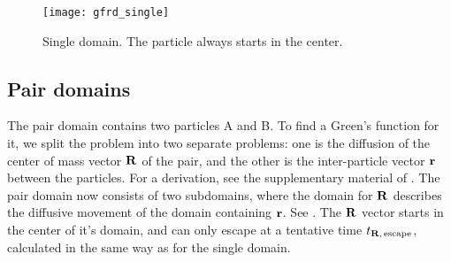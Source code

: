 \begin{figure}[ht]
\centering
\texttt{[image: gfrd\_single]}
\caption{ Single domain. The particle always starts in the center.}
\end{figure}


\subsection{Pair domains}
The pair domain contains two particles A and B. To find a Green's function for it, we split the problem into two separate problems: one is the diffusion of the center of mass vector ${\bf R}$ of the pair, and the other is the inter-particle vector ${\bf r}$ between the particles. For a derivation, see the supplementary material of \cite{Takahashi2010}. The pair domain now consists of two subdomains, where the domain for ${\bf R}$ describes the diffusive movement of the domain containing ${\bf r}$. See . The ${\bf R}$ vector starts in the center of it's domain, and can only escape at a tentative time $t_{{\bf R},\,{\rm escape}}$, calculated in the same way as for the single domain. 

